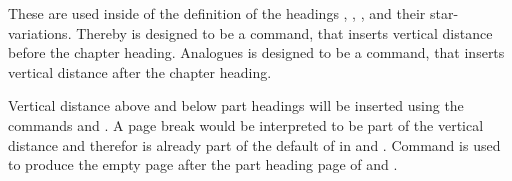\begin{Declaration}
  \\
  \\
  \\
  \\
  \\
\end{Declaration}
%
%
%
%
%
%
These are used inside of the definition of the headings
, , ,
 and their star-variations. Thereby
 is designed to be a command, that inserts
vertical distance before the chapter heading. Analogues
 is designed to be a command, that inserts vertical
distance after the chapter heading.

Vertical distance above and below part headings will be inserted using the
commands  and . A page break
would be interpreted to be part of the vertical distance and therefor is
already part of the default of  in
 and
. Command
 is used to produce the empty page after the part heading
page of  and .

